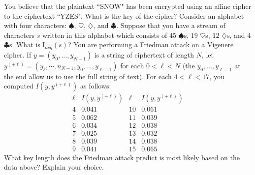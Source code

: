 \documentclass[11pt,addpoints,letterpaper]{exam}
\begin{document}
\begin{questions}
   
   \newpage
  \question[4] You believe that the plaintext ``SNOW" has been encrypted using an affine cipher to the ciphertext ``YZES". What is the key of the cipher?
 \vfill
 \question[3] Consider an alphabet with four characters: $\spadesuit$, $\heartsuit$, $\diamondsuit$, and $\clubsuit$.  Suppose that you have a stream of characters ${s}$ written in this alphabet which consists of $45$ $\spadesuit$s,  $19$ $\heartsuit$s, $12$ $\diamondsuit$s, and $4$ $\clubsuit$s.  What is $\textrm{I}_{avg}({s})$?
 \vfill
 \newpage
\question[3] You are performing a Friedman attack on a Vigenere cipher. If $y=(y_0,\ldots, y_{N-1})$ is a string of ciphertext of length $N$, let $y^{(+\ell)}=(y_\ell,\cdots, n_{N-1},y_0,\ldots,y_{\ell-1})$ for each $0<\ell<N$ (the $y_0,\ldots,y_{\ell-1}$ at the end allow us to use the full string of text). For each $4<\ell<17$, you computed $I(y,y^{(+\ell)})$ as follows:
$$
\begin{array}{l|l|l|l}
\ell & I(y,y^{(+\ell)}) & \ell & I(y,y^{(+\ell)})\\ \hline
4 & 0.041&10 & 0.061\\
5 & 0.062&11 & 0.039\\
6 & 0.034&12 & 0.038\\
7 & 0.025& 13 & 0.032\\
8 & 0.039&14 & 0.038\\
9 & 0.041 &15 & 0.065
\end{array}
$$
What key length does the Friedman attack predict is most likely based on the data above? Explain your choice.
%

\end{questions}
\end{document}
